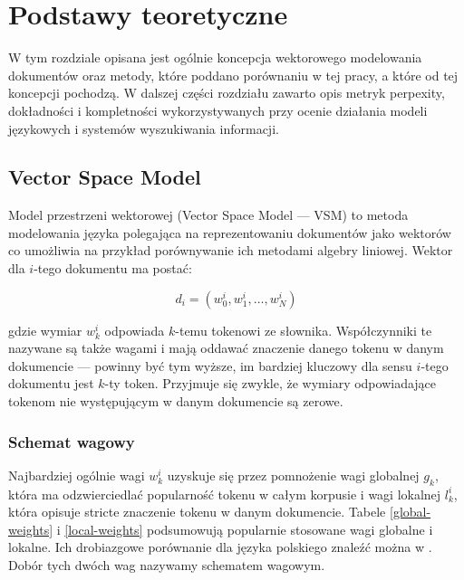 \documentclass[11pt,a4paper]{article}
\begin{document}
\pagebreak


\section{Podstawy teoretyczne}
\label{sec:theory}

W tym rozdziale opisana jest ogólnie koncepcja wektorowego modelowania
dokumentów oraz metody, które poddano porównaniu w tej pracy, a które od tej
koncepcji pochodzą. W dalszej części rozdziału zawarto opis metryk perpexity,
dokładności i kompletności wykorzystywanych przy ocenie działania modeli
językowych i systemów wyszukiwania informacji.

\subsection{Vector Space Model}

Model przestrzeni wektorowej (Vector Space Model --- VSM) to metoda modelowania
języka polegająca na reprezentowaniu dokumentów jako wektorów co umożliwia na
przykład porównywanie ich metodami algebry liniowej.  Wektor dla $i$-tego
dokumentu ma postać:

\begin{equation}
d_i = (w^i_0, w^i_1, \ldots, w^i_N)
\end{equation}

\noindent
gdzie wymiar $w^i_k$ odpowiada $k$-temu tokenowi ze słownika. Współczynniki te
nazywane są także wagami i mają oddawać znaczenie danego tokenu w danym
dokumencie --- powinny być tym wyższe, im bardziej kluczowy dla sensu $i$-tego
dokumentu jest $k$-ty token. Przyjmuje się zwykle, że wymiary odpowiadające
tokenom nie występującym w danym dokumencie są zerowe.

\subsubsection{Schemat wagowy}
\label{weighting-theory}
Najbardziej ogólnie wagi $w^i_k$ uzyskuje się przez pomnożenie wagi globalnej
$g_k$, która ma odzwierciedlać popularność tokenu w całym korpusie i wagi
lokalnej $l^i_k$, która opisuje stricte znaczenie tokenu w danym dokumencie.
Tabele \ref{global-weights} i \ref{local-weights} podsumowują popularnie
stosowane wagi globalne i lokalne. Ich drobiazgowe porównanie dla języka
polskiego znaleźć można w \cite{figiel}. Dobór tych dwóch wag nazywamy
schematem wagowym.
\end{document}
